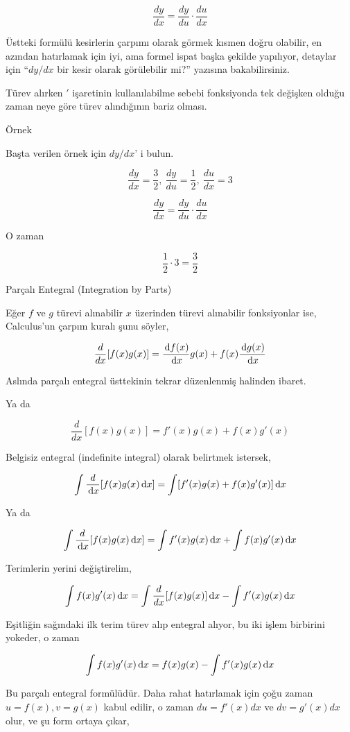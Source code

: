 \documentclass[12pt,fleqn]{article}\usepackage{../../common}
\begin{document}
$$ \frac{ dy}{dx} = \frac{ dy}{du} \cdot \frac{ du}{dx} $$

Üstteki formülü kesirlerin çarpımı olarak görmek kısmen doğru olabilir, en
azından hatırlamak için iyi, ama formel ispat başka şekilde yapılıyor,
detaylar için ``$dy/dx$ bir kesir olarak görülebilir mi?'' yazısına
bakabilirsiniz.

Türev alırken $'$ işaretinin kullanılabilme sebebi fonksiyonda tek değişken
olduğu zaman neye göre türev alındığının bariz olması.

Örnek 

Başta verilen örnek için $dy/dx$' i bulun. 

$$ \frac{ dy}{dx} = \frac{ 3}{2}, \
\frac{dy}{du} = \frac{ 1}{2}, \
\frac{ du}{dx} = 3
 $$

$$ \frac{ dy}{dx} = \frac{ dy}{du} \cdot \frac{ du}{dx} $$

O zaman 

$$ \frac{ 1}{2} \cdot 3 = \frac{ 3}{2} $$

\newpage

Parçalı Entegral (Integration by Parts)

Eğer $f$ ve $g$ türevi alınabilir $x$ üzerinden türevi alınabilir
fonksiyonlar ise, Calculus'un çarpım kuralı şunu söyler, 

$$ 
\frac{d}{dx} [ f(x)g(x) ] = 
\frac{\,\mathrm{d} f(x)}{\,\mathrm{d} x}g(x) + f(x) \frac{\,\mathrm{d}  g(x)}{\,\mathrm{d} x}
$$

Aslında parçalı entegral üsttekinin tekrar düzenlenmiş halinden ibaret. 

Ya da

$$ \frac{d}{dx} [ f(x)g(x) ] = f'(x)g(x) + f(x)g'(x)$$

Belgisiz entegral (indefinite integral) olarak belirtmek istersek, 

$$ \int \frac{d}{\,\mathrm{d} x}[ f(x)g(x) \,\mathrm{d} x ] = \int [f'(x)g(x) + f(x)g'(x)] \,\mathrm{d} x$$

Ya da

$$
\int \frac{d}{\,\mathrm{d} x}[ f(x)g(x) \,\mathrm{d} x ] = \int f'(x)g(x) \,\mathrm{d} x + \int f(x)g'(x)\,\mathrm{d} x
$$

Terimlerin yerini değiştirelim, 

$$
\int f(x)g'(x) \,\mathrm{d} x = \int \frac{d}{dx}[f(x)g(x)] \,\mathrm{d} x - \int f'(x)g(x) \,\mathrm{d} x
$$

Eşitliğin sağındaki ilk terim türev alıp entegral alıyor, bu iki işlem
birbirini yokeder, o zaman 

$$ \int f(x)g'(x) \,\mathrm{d} x = f(x)g(x) - \int f'(x)g(x) \,\mathrm{d} x$$

Bu parçalı entegral formülüdür. Daha rahat hatırlamak için çoğu zaman
$u=f(x),v=g(x)$ kabul edilir, o zaman $du = f'(x)dx$ ve $dv = g'(x)dx$
olur, ve şu form ortaya çıkar,
\end{document}

